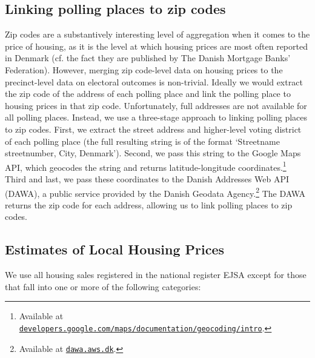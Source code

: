 \documentclass[12pt,a4paper]{article}
\begin{document}
	\localtableofcontents

	
	\newpage
	
	\subsection{Linking polling places to zip codes}\label{app_linking}
	
	Zip codes are a substantively interesting level of aggregation when it comes to the price of housing, as it is the level at which housing prices are most often reported in Denmark (cf. the fact they are published by The Danish Mortgage Banks' Federation). However, merging zip code-level data on housing prices to the precinct-level data on electoral outcomes is non-trivial. Ideally we would extract the zip code of the address of each polling place and link the polling place to housing prices in that zip code. Unfortunately, full addresses are not available for all polling places. Instead, we use a three-stage approach to linking polling places to zip codes. First, we extract the street address and higher-level voting district of each polling place (the full resulting string is of the format `Streetname streetnumber, City, Denmark'). Second, we pass this string to the Google Maps API, which geocodes the string and returns latitude-longitude coordinates.\footnote{Available at \texttt{\href{https://developers.google.com/maps/documentation/geocoding/intro}{developers.google.com/maps/documentation/geocoding/intro}}.} Third and last, we pass these coordinates to the Danish Addresses Web API (DAWA), a public service provided by the Danish Geodata Agency.\footnote{Available at \texttt{\href{http://dawa.aws.dk/}{dawa.aws.dk}}.} The DAWA returns the zip code for each address, allowing us to link polling places to zip codes. %
	
	\newpage
	
	\subsection{Estimates of  Local Housing Prices}\label{app_housingselect}
	
	We use all housing sales registered in the national register EJSA except for those that fall into one or more of the following categories:
	
\end{document}
